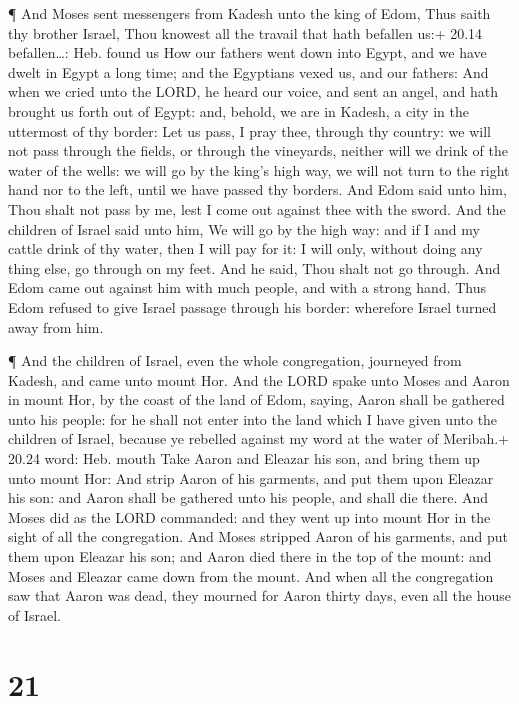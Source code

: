  ¶ And Moses sent messengers from Kadesh unto the king of
Edom, Thus saith thy brother Israel, Thou knowest all the travail that
hath befallen us:+ 20.14 befallen\ldots: Heb. found us  How
our fathers went down into Egypt, and we have dwelt in Egypt a long
time; and the Egyptians vexed us, and our fathers:  And
when we cried unto the LORD, he heard our voice, and sent an angel, and
hath brought us forth out of Egypt: and, behold, we are in Kadesh, a
city in the uttermost of thy border:  Let us pass, I pray
thee, through thy country: we will not pass through the fields, or
through the vineyards, neither will we drink of the water of the wells:
we will go by the king's high way, we will not turn to the right hand
nor to the left, until we have passed thy borders.  And
Edom said unto him, Thou shalt not pass by me, lest I come out against
thee with the sword.  And the children of Israel said unto
him, We will go by the high way: and if I and my cattle drink of thy
water, then I will pay for it: I will only, without doing any thing
else, go through on my feet.  And he said, Thou shalt not
go through. And Edom came out against him with much people, and with a
strong hand.  Thus Edom refused to give Israel passage
through his border: wherefore Israel turned away from him.

 ¶ And the children of Israel, even the whole congregation,
journeyed from Kadesh, and came unto mount Hor.  And the
LORD spake unto Moses and Aaron in mount Hor, by the coast of the land
of Edom, saying,  Aaron shall be gathered unto his people:
for he shall not enter into the land which I have given unto the
children of Israel, because ye rebelled against my word at the water of
Meribah.+ 20.24 word: Heb. mouth  Take Aaron and Eleazar
his son, and bring them up unto mount Hor:  And strip Aaron
of his garments, and put them upon Eleazar his son: and Aaron shall be
gathered unto his people, and shall die there.  And Moses
did as the LORD commanded: and they went up into mount Hor in the sight
of all the congregation.  And Moses stripped Aaron of his
garments, and put them upon Eleazar his son; and Aaron died there in the
top of the mount: and Moses and Eleazar came down from the mount.
 And when all the congregation saw that Aaron was dead,
they mourned for Aaron thirty days, even all the house of Israel.

\hypertarget{section-20}{%
\section{21}\label{section-20}}

